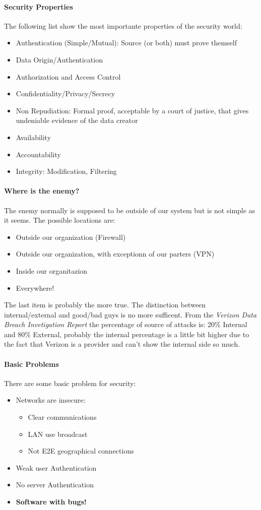 \documentclass[12pt]{article}
\begin{document}
\paragraph{Security Properties} The following list show the most importante properties of the security world:
\begin{itemize}
  \item Authentication (Simple/Mutual): Source (or both) must prove themself
  \item Data Origin/Authentication
  \item Authorization and Access Control
  \item Confidentiality/Privacy/Secrecy
  \item Non Repudiation: Formal proof, acceptable by a court of justice, that gives undeniable evidence of the data creator
  \item Availability
  \item Accountability
  \item Integrity: Modification, Filtering
\end{itemize}

\paragraph{Where is the enemy?} The enemy normally is supposed to be outside of our system but is not simple as it seems. The possible locations are:
\begin{itemize}
  \item Outside our organization (Firewall)
  \item Outside our organization, with exceptionn of our parters (VPN)
  \item Inside our organitazion
  \item Everywhere!
\end{itemize}
The last item is probably the more true. The distinction between internal/external and good/bad guys is no more sufficent. From the \textit{Verizon Data Breach Invetigation Report} the percentage of source of attacks is: 20\% Internal and 80\% External, probably the internal percentage is a little bit higher due to the fact that Verizon is a provider and can't show the internal side so much.

\paragraph{Basic Problems} There are some basic problem for security:
\begin{itemize}
  \item Networks are insecure:
  \begin{itemize}
    \item Clear communications
    \item LAN use broadcast
    \item Not E2E geographical connections
  \end{itemize}
  \item Weak user Authentication
  \item No server Authentication
  \item \textbf{Software with bugs!}
\end{itemize}
\end{document}

